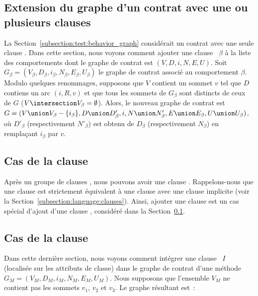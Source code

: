 \subsection{Extension du graphe d'un contrat avec une ou plusieurs clauses
\abehavior}
\label{subsection:test:behaviors_graph}

La Section~\ref{subsection:test:behavior_graph} considérait un contrat avec une
seule clause \abehavior. Dans cette section, nous voyons comment ajouter une
clause \abehavior~$\beta$ à la liste des comportements dont le graphe de contrat
est $(V, D, i, N, E, U)$. Soit $G_\beta = (V_\beta, D_\beta, i_\beta, N_\beta,
E_\beta, U_\beta)$ le graphe de contrat associé au comportement $\beta$. Modulo
quelques renommages, supposons que $V$ contient un sommet $v$ tel que $D$
contiens un arc $(i, R, v)$ et que tous les sommets de $G_\beta$ sont distincts
de ceux de $G$ ($V \intersection V_\beta = \emptyset$). Alors, le nouveau graphe
de contrat est $G = (V \union V_\beta - \{i_\beta\}, D \union D'_\beta, i, N
\union N'_\beta, E \union E_\beta, U \union U_\beta)$, où $D'_\beta$
(respectivement $N'_\beta$) est obtenu de $D_\beta$ (respectivement $N_\beta$)
en remplaçant $i_\beta$ par $v$.

\subsection{Cas de la clause \adefault}
\label{subsection:test:default_graph}

Après un groupe de clauses \abehavior, nous pouvons avoir une clause \adefault.
Rappelons-nous que une clause \adefault est strictement équivalent à une clause
\abehavior avec une clause \arequires implicite (voir la
Section~\ref{subsection:language:clauses}). Ainsi, ajouter une clause \adefault
est un cas spécial d'ajout d'une clause \abehavior, considéré dans la
Section~\ref{subsection:test:behaviors_graph}.

\subsection{Cas de la clause \ainvariant}
\label{subsection:test:invariant_graph}

Dans cette dernière section, nous voyons comment intégrer une clause
\ainvariant~$I$ (localisée sur les attributs de classe) dans le graphe de
contrat d'une méthode $G_M = (V_M, D_M, i_M, N_M, E_M, U_M)$. Nous supposons que
l'ensemble $V_M$ ne contient pas les sommets $v_1$, $v_2$ et $v_3$. Le graphe
résultant est~:

